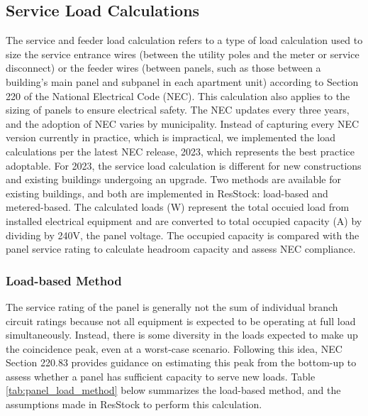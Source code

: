\subsection{Service Load Calculations}
The service and feeder load calculation refers to a type of load calculation used to size the service entrance wires (between the utility poles and the meter or service disconnect) or the feeder wires (between panels, such as those between a building’s main panel and subpanel in each apartment unit) according to Section 220 of the National Electrical Code (NEC). This calculation also applies to the sizing of panels to ensure electrical safety. The NEC updates every three years, and the adoption of NEC varies by municipality. Instead of capturing every NEC version currently in practice, which is impractical, we implemented the load calculations per the latest NEC release, 2023, which represents the best practice adoptable. For 2023, the service load calculation is different for new constructions and existing buildings undergoing an upgrade. Two methods are available for existing buildings, and both are implemented in ResStock: load-based and metered-based. The calculated loads (W) represent the total occuied load from installed electrical equipment and are converted to total occupied capacity (A) by dividing by 240V, the panel voltage. The occupied capacity is compared with the panel service rating to calculate headroom capacity and assess NEC compliance.

\subsubsection{Load-based Method}
The service rating of the panel is generally not the sum of individual branch circuit ratings because not all equipment is expected to be operating at full load simultaneously. Instead, there is some diversity in the loads expected to make up the coincidence peak, even at a worst-case scenario. Following this idea, NEC Section 220.83 provides guidance on estimating this peak from the bottom-up to assess whether a panel has sufficient capacity to serve new loads. Table \ref{tab:panel_load_method} below summarizes the load-based method, and the assumptions made in ResStock to perform this calculation.

